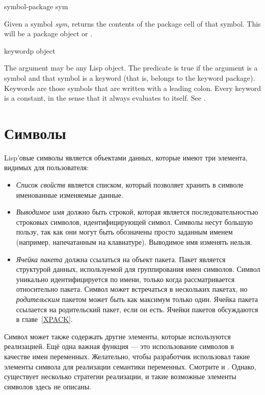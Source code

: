 \begin{defun}[Function]
symbol-package sym

Given a symbol \emph{sym},  returns the contents of the
package cell of that symbol.  This will be a package object or {\nil}.
\end{defun}

\begin{defun}[Function]
keywordp object

The argument may be any Lisp object.  The predicate  is true
if the argument is a symbol and that
symbol is a keyword (that is, belongs to the keyword
package).  Keywords are those symbols that are written with
a leading colon.  Every keyword is a constant, in the sense
that it always evaluates to itself.  See .
\end{defun}

\else

\chapter{Символы}
\label{symbol}

Lisp'овые символы является объектами данных, которые имеют три элемента, видимых
для пользователя:
\begin{itemize}
\item
\emph{Список свойств} является списком, который позволяет хранить в символе
именованные изменяемые данные.

\item
\emph{Выводимое имя} должно быть строкой, которая является последовательностью
строковых символов, идентифицирующей символ. Символы несут большую пользу, так
как они могут быть обозначены просто заданным именем (например, напечатанным на
клавиатуре).
Выводимое имя изменять нельзя.

\item
\emph{Ячейка пакета} должна ссылаться на объект пакета.
Пакет является структурой данных, используемой для группирования имен символов.
Символ уникально идентифицируется по имени, только когда рассматривается
относительно пакета. Символ может встречаться в нескольких пакетах, но
\emph{родительским} пакетом может быть как максимум только один.
Ячейка пакета ссылается на родительский пакет, если он есть.
Ячейки пакетов обсуждаются в главе~\ref{XPACK}.
\end{itemize}

Символ может также содержать другие элементы, которые используются
реализацией. Ещё одна важная функция --- это использование символов в качестве
имен переменных.  Желательно, чтобы разработчик использовал такие элементы
символа для реализации семантики переменных. Смотрите  и
. Однако, существует несколько стратегии реализации, и
такие возможные элементы символов здесь не описаны.

